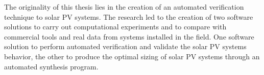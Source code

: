 
The originality of this thesis lies in the creation of an automated verification technique to solar PV systems. The research led to the creation of two software solutions to carry out computational experiments and to compare with commercial tools and real data from systems installed in the field. One software solution to perform automated verification and validate the solar PV systems behavior, the other to produce the optimal sizing of solar PV systems through an automated synthesis program.

